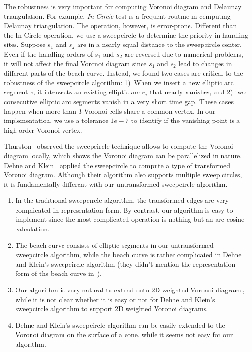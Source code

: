 {{The robustness is very important for computing Voronoi diagram and Delaunay
triangulation. For example, {\em In-Circle} test is a frequent routine in computing
Delaunay triangulation. The operation, however, is error-prone. Different than the
In-Circle operation, we use a sweepcircle to determine the priority in handling sites.
Suppose $s_1$ and $s_2$ are in a nearly equal distance to the sweepcircle center.
Even if the handling orders of $s_1$ and $s_2$ are reversed due to numerical problems,
it will not affect the final Voronoi diagram since $s_1$ and $s_2$ lead to changes in
different parts of the beach curve. Instead, we found two cases are critical to the
robustness of the sweepcircle algorithm: 1)~When we insert a new elliptic arc
segment $e$, it intersects an existing elliptic arc $e_i$ that nearly vanishes;
and 2) two consecutive elliptic arc segments vanish in a very short time gap.
These cases happen when more than 3 Voronoi cells share a common vertex. In our
implementation, we use a tolerance $1e-7$ to identify if the vanishing point is
a high-order Voronoi vertex.

Thurston~\cite{Thurston:1986} observed the sweepcircle technique allows to compute the Voronoi diagram locally, which shows the Voronoi diagram can be parallelized in nature.
Dehne and Klein~\cite{Dehne_Klein:1987} applied the sweepcircle to compute a type of transformed Voronoi diagram. Although their algorithm also supports multiple sweep circles, it is fundamentally different with our untransformed sweepcircle algorithm.
\begin{enumerate}
\item In the traditional sweepcircle algorithm, the transformed edges are very complicated in representation form. By contrast, our algorithm is easy to implement since the most complicated operation is nothing but an arc-cosine calculation.
\item The beach curve consists of elliptic segments in our untransformed sweepcircle algorithm, while the beach curve is rather complicated in Dehne and Klein's sweepcircle algorithm (they didn't mention the representation form of the beach curve in~\cite{Dehne_Klein:1987}).
\item Our algorithm is very natural to extend onto 2D weighted Voronoi diagrams, while it is not clear whether it is easy or not for Dehne and Klein's sweepcircle algorithm to support 2D weighted Voronoi diagrams.
\item Dehne and Klein's sweepcircle algorithm can be easily extended to the Voronoi diagram on the surface of a cone, while it seems not easy for our algorithm.
\end{enumerate}
\vspace{-0.1in}
}}
